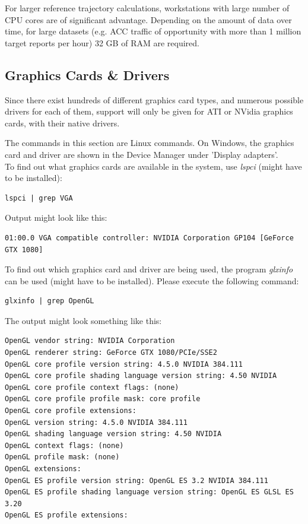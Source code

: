 For larger reference trajectory calculations, workstations with large number of CPU cores are of significant advantage. Depending on the amount of data over time, for large datasets (e.g. ACC traffic of opportunity with more than 1 million target reports per hour) 32 GB of RAM are required.


\subsection{Graphics Cards \& Drivers}
\label{sec:graphics_installation}

Since there exist hundreds of different graphics card types, and numerous possible drivers for each of them, support will only be given for ATI or NVidia graphics cards, with their native drivers.

The commands in this section are Linux commands. On Windows, the graphics card and driver are shown in the Device Manager under 'Display adapters'. \\

To find out what graphics cards are available in the system, use \textit{lspci} (might have to be installed):

\begin{lstlisting}
lspci | grep VGA
\end{lstlisting}

Output might look like this:

\begin{lstlisting}
01:00.0 VGA compatible controller: NVIDIA Corporation GP104 [GeForce GTX 1080]
\end{lstlisting}

To find out which graphics card and driver are being used, the program \textit{glxinfo} can be used (might have to be installed). Please execute the following command:

\begin{lstlisting}
glxinfo | grep OpenGL
\end{lstlisting}

The output might look something like this:

\begin{lstlisting}
OpenGL vendor string: NVIDIA Corporation
OpenGL renderer string: GeForce GTX 1080/PCIe/SSE2
OpenGL core profile version string: 4.5.0 NVIDIA 384.111
OpenGL core profile shading language version string: 4.50 NVIDIA
OpenGL core profile context flags: (none)
OpenGL core profile profile mask: core profile
OpenGL core profile extensions:
OpenGL version string: 4.5.0 NVIDIA 384.111
OpenGL shading language version string: 4.50 NVIDIA
OpenGL context flags: (none)
OpenGL profile mask: (none)
OpenGL extensions:
OpenGL ES profile version string: OpenGL ES 3.2 NVIDIA 384.111
OpenGL ES profile shading language version string: OpenGL ES GLSL ES 3.20
OpenGL ES profile extensions:
\end{lstlisting}

